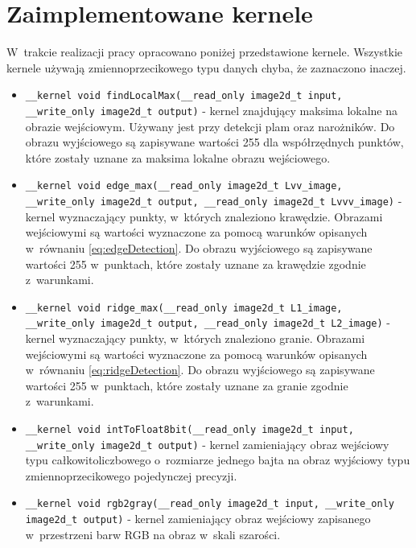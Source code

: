 \chapter{Zaimplementowane kernele}
\label{cha:kernele}

W~trakcie realizacji pracy opracowano poniżej przedstawione kernele. Wszystkie kernele używają zmiennoprzecikowego typu danych chyba, że zaznaczono inaczej.

\begin{itemize}
\item 
\texttt{\_\_kernel void findLocalMax(\_\_read\_only image2d\_t input, \_\_write\_only image2d\_t output)} - kernel znajdujący maksima lokalne na obrazie wejściowym. Używany jest przy detekcji plam oraz narożników. Do obrazu wyjściowego są zapisywane wartości 255 dla współrzędnych punktów, które zostały uznane za maksima lokalne obrazu wejściowego.

\item 
\texttt{\_\_kernel void  edge\_max(\_\_read\_only image2d\_t Lvv\_image, \_\_write\_only image2d\_t output, \_\_read\_only image2d\_t Lvvv\_image)} - kernel wyznaczający punkty, w~których znaleziono krawędzie. Obrazami wejściowymi są wartości wyznaczone za pomocą warunków opisanych w~równaniu \eqref{eq:edgeDetection}. Do obrazu wyjściowego są zapisywane wartości 255 w~punktach, które zostały uznane za krawędzie zgodnie z~warunkami.

\item 
\texttt{\_\_kernel void  ridge\_max(\_\_read\_only image2d\_t L1\_image, \_\_write\_only image2d\_t output, \_\_read\_only image2d\_t L2\_image)} - kernel wyznaczający punkty, w~których znaleziono granie. Obrazami wejściowymi są wartości wyznaczone za pomocą warunków opisanych w~równaniu \eqref{eq:ridgeDetection}. Do obrazu wyjściowego są zapisywane wartości 255 w~punktach, które zostały uznane za granie zgodnie z~warunkami.

\item 
\texttt{\_\_kernel void  intToFloat8bit(\_\_read\_only image2d\_t input, \_\_write\_only image2d\_t output)} - kernel zamieniający obraz wejściowy typu całkowitoliczbowego o~rozmiarze jednego bajta na obraz wyjściowy typu zmiennoprzecikowego pojedynczej precyzji.

\item 
\texttt{\_\_kernel void rgb2gray(\_\_read\_only image2d\_t input, \_\_write\_only image2d\_t output)} - kernel zamieniający obraz wejściowy zapisanego w~przestrzeni barw RGB na obraz w~skali szarości.


\end{itemize}
